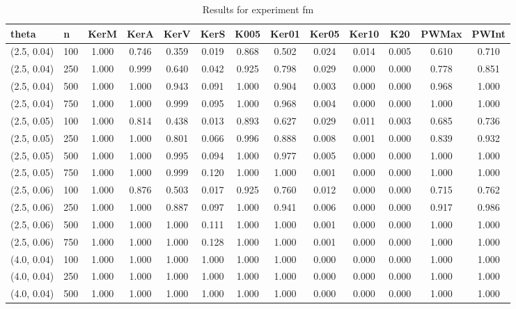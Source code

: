  \begin{table}[ht]
	\centering
	
	\caption{Results for experiment fm}
	\tiny{
		\begin{tabular}{ll|ccccccccccc}
			\hline
			theta & n & KerM & KerA & KerV & KerS & K005 & Ker01 & Ker05 & Ker10 & K20 & PWMax & PWInt \\
			\hline
			(2.5, 0.04) & 100 & 1.000 & 0.746 & 0.359 & 0.019 & 0.868 & 0.502 & 0.024 & 0.014 & 0.005 & 0.610 & 0.710 \\
			(2.5, 0.04) & 250 & 1.000 & 0.999 & 0.640 & 0.042 & 0.925 & 0.798 & 0.029 & 0.000 & 0.000 & 0.778 & 0.851 \\
			(2.5, 0.04) & 500 & 1.000 & 1.000 & 0.943 & 0.091 & 1.000 & 0.904 & 0.003 & 0.000 & 0.000 & 0.968 & 1.000 \\
			(2.5, 0.04) & 750 & 1.000 & 1.000 & 0.999 & 0.095 & 1.000 & 0.968 & 0.004 & 0.000 & 0.000 & 1.000 & 1.000 \\
			(2.5, 0.05) & 100 & 1.000 & 0.814 & 0.438 & 0.013 & 0.893 & 0.627 & 0.029 & 0.011 & 0.003 & 0.685 & 0.736 \\
			(2.5, 0.05) & 250 & 1.000 & 1.000 & 0.801 & 0.066 & 0.996 & 0.888 & 0.008 & 0.001 & 0.000 & 0.839 & 0.932 \\
			(2.5, 0.05) & 500 & 1.000 & 1.000 & 0.995 & 0.094 & 1.000 & 0.977 & 0.005 & 0.000 & 0.000 & 1.000 & 1.000 \\
			(2.5, 0.05) & 750 & 1.000 & 1.000 & 0.999 & 0.120 & 1.000 & 1.000 & 0.001 & 0.000 & 0.000 & 1.000 & 1.000 \\
			(2.5, 0.06) & 100 & 1.000 & 0.876 & 0.503 & 0.017 & 0.925 & 0.760 & 0.012 & 0.000 & 0.000 & 0.715 & 0.762 \\
			(2.5, 0.06) & 250 & 1.000 & 1.000 & 0.887 & 0.097 & 1.000 & 0.941 & 0.006 & 0.000 & 0.000 & 0.917 & 0.986 \\
			(2.5, 0.06) & 500 & 1.000 & 1.000 & 1.000 & 0.111 & 1.000 & 1.000 & 0.001 & 0.000 & 0.000 & 1.000 & 1.000 \\
			(2.5, 0.06) & 750 & 1.000 & 1.000 & 1.000 & 0.128 & 1.000 & 1.000 & 0.001 & 0.000 & 0.000 & 1.000 & 1.000 \\
			(4.0, 0.04) & 100 & 1.000 & 1.000 & 1.000 & 1.000 & 1.000 & 1.000 & 0.000 & 0.000 & 0.000 & 1.000 & 1.000 \\
			(4.0, 0.04) & 250 & 1.000 & 1.000 & 1.000 & 1.000 & 1.000 & 1.000 & 0.000 & 0.000 & 0.000 & 1.000 & 1.000 \\
			(4.0, 0.04) & 500 & 1.000 & 1.000 & 1.000 & 1.000 & 1.000 & 1.000 & 0.000 & 0.000 & 0.000 & 1.000 & 1.000 \\

\end{tabular}}
\end{table}
